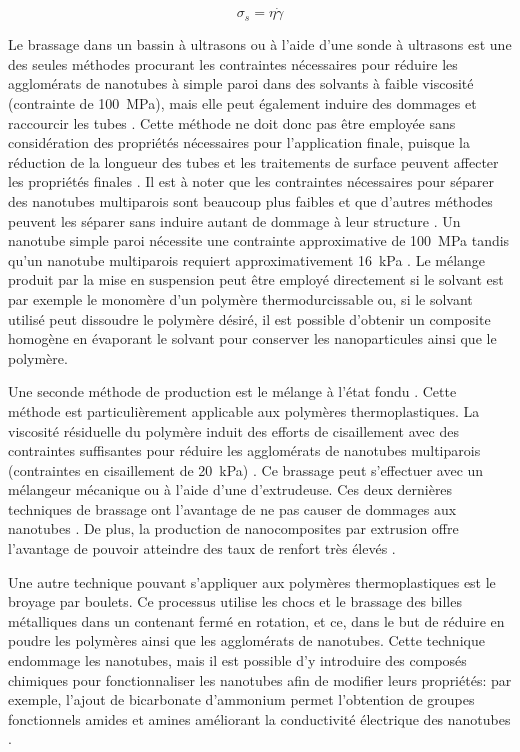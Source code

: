 \begin{equation}
\sigma_s = \eta \dot{\gamma}
\end{equation}

Le brassage dans un bassin à ultrasons ou à l'aide d'une sonde à ultrasons est une des seules méthodes procurant les contraintes nécessaires pour réduire les agglomérats de nanotubes à simple paroi dans des solvants à faible viscosité (contrainte de \SI[locale=FR]{100}{\mega\pascal}), mais elle peut également induire des dommages et raccourcir les tubes \cite{Huang2012}. 
Cette méthode ne doit donc pas être employée sans considération des propriétés nécessaires pour l'application finale, puisque la réduction de la longueur des tubes et les traitements de surface peuvent affecter les propriétés finales \cite{Grossiord2008a, Diez-Pascual2010, Ma2008}.  
Il est à noter que les contraintes nécessaires pour séparer des nanotubes multiparois sont beaucoup plus faibles et que d'autres méthodes peuvent les séparer sans induire autant de dommage à leur structure \cite{Huang2012, Ma2010}. 
Un nanotube simple paroi nécessite une contrainte approximative de \SI[locale=FR]{100}{\mega\pascal} tandis qu'un nanotube multiparois requiert approximativement \SI[locale=FR]{16}{\kilo\pascal} \cite{Huang2012}. 
Le mélange produit par la mise en suspension peut être employé directement si le solvant est par exemple le monomère d'un polymère thermodurcissable ou, si le solvant utilisé peut dissoudre le polymère désiré, il est possible d'obtenir un composite homogène en évaporant le solvant pour conserver les nanoparticules ainsi que le polymère. 

Une seconde méthode de production est le mélange à l'état fondu \cite{Ma2010}. 
Cette méthode est particulièrement applicable aux polymères thermoplastiques.
La viscosité résiduelle du polymère induit des efforts de cisaillement avec des contraintes suffisantes pour réduire les agglomérats de nanotubes multiparois (contraintes en cisaillement de \SI[locale=FR]{20}{\kilo\pascal}) \cite{Huang2012}. 
Ce brassage peut s'effectuer avec un mélangeur mécanique ou à l'aide d'une d'extrudeuse. 
Ces deux dernières techniques de brassage ont l'avantage de ne pas causer de dommages aux nanotubes \cite{Ma2010}. 
De plus, la production de nanocomposites par extrusion offre l'avantage de pouvoir atteindre des taux de renfort très élevés \cite{Ma2010}. 

Une autre technique pouvant s'appliquer aux polymères thermoplastiques est le broyage par boulets. 
Ce processus utilise les chocs et le brassage des billes métalliques dans un contenant fermé en rotation, et ce, dans le but de réduire en poudre les polymères ainsi que les agglomérats de nanotubes.
Cette technique endommage les nanotubes, mais il est possible d'y introduire des composés chimiques pour fonctionnaliser les nanotubes afin de modifier leurs propriétés: par exemple, l'ajout de bicarbonate d'ammonium permet l'obtention de groupes fonctionnels amides et amines améliorant la conductivité électrique des nanotubes \cite{Ma2010, Ma2008a}. 

